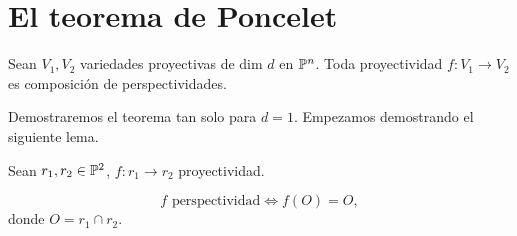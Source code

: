 \section{El teorema de Poncelet}

\begin{teo}[de Poncelet]
	Sean $V_1, V_2$ variedades proyectivas de dim $d$ en $\mathbb{P}^n$. Toda proyectividad $f \colon V_1 \to V_2$
	es composición de perspectividades.
\end{teo}

Demostraremos el teorema tan solo para $d = 1$. Empezamos
demostrando el siguiente lema.

\begin{lema} 
    \label{lema_poncelet}
    Sean $r_1, r_2 \in \mathbb{P}^2$, $f \colon r_1 \to r_2$ proyectividad.
    
    \[f \text{ perspectividad} \iff f(O) = O,\]
    donde $O = r_1 \cap r_2$.
\end{lema}

